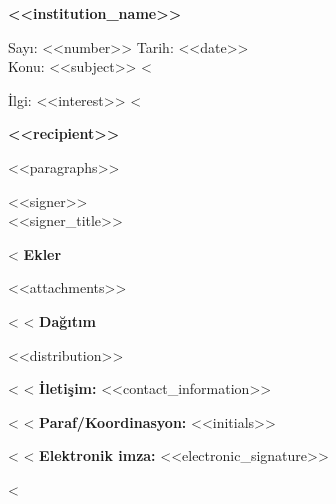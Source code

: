 \documentclass[11pt,a4paper]{article}
\begin{document}
\begin{center}
{\bfseries <<institution_name>>}
\end{center}
\noindent Sayı: <<number>> \hfill Tarih: <<date>>\\
\noindent Konu: <<subject>>
<%
\par\noindent İlgi: <<interest>>
<%
\vspace{6mm}
\begin{center}\bfseries <<recipient>>\end{center}
<<paragraphs>>
\vspace{10mm}
\begin{flushright}
<<signer>>\\
<<signer_title>>
\end{flushright}
<%
\noindent\textbf{Ekler}
\begin{enumerate}[leftmargin=*]
<<attachments>>
\end{enumerate}
<%
<%
\noindent\textbf{Dağıtım}
\begin{itemize}[leftmargin=*]
<<distribution>>
\end{itemize}
<%
<%
\noindent\textbf{İletişim:} <<contact_information>>\par
<%
<%
\noindent\textbf{Paraf/Koordinasyon:} <<initials>>\par
<%
<%
\noindent\textbf{Elektronik imza:} <<electronic_signature>>\par
<%
\end{document}
